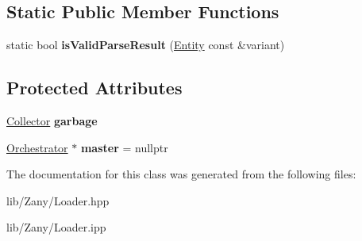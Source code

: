 \subsection*{Static Public Member Functions}
\begin{DoxyCompactItemize}
\item 
\mbox{\label{classzany_1_1_loader_1_1_abstract_module_ac19f88dd1e02ae93508e92e0a4a1dadb}} 
static bool {\bfseries is\+Valid\+Parse\+Result} (\hyperlink{classzany_1_1_entity}{Entity} const \&variant)
\end{DoxyCompactItemize}
\subsection*{Protected Attributes}
\begin{DoxyCompactItemize}
\item 
\mbox{\label{classzany_1_1_loader_1_1_abstract_module_a628e207c1499413aeaf6ca77a2aae728}} 
\hyperlink{classzany_1_1_loader_1_1_abstract_module_1_1_collector}{Collector} {\bfseries garbage}
\item 
\mbox{\label{classzany_1_1_loader_1_1_abstract_module_aa4bdf493407f1a899dd3dc18e50b9954}} 
\hyperlink{classzany_1_1_orchestrator}{Orchestrator} $\ast$ {\bfseries master} = nullptr
\end{DoxyCompactItemize}


The documentation for this class was generated from the following files\+:\begin{DoxyCompactItemize}
\item 
lib/\+Zany/Loader.\+hpp\item 
lib/\+Zany/Loader.\+ipp\end{DoxyCompactItemize}
